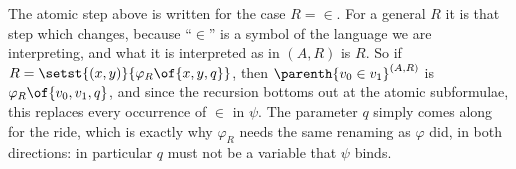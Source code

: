The atomic step above is written for the case $R = \in$. For a general $R$ it is that step which changes, because ``$\in$'' is a symbol of the language we are interpreting, and what it is interpreted as in $(A, R)$ is $R$. So if $R = \setst{(x, y)}{\varphi_R\of{x, y, q}}$, then $\parenth{v_0 \in v_1}^{(A, R)}$ is $\varphi_R\of{v_0, v_1, q}$, and since the recursion bottoms out at the atomic subformulae, this replaces every occurrence of $\in$ in $\psi$. The parameter $q$ simply comes along for the ride, which is exactly why $\varphi_R$ needs the same renaming as $\varphi$ did, in both directions: in particular $q$ must not be a variable that $\psi$ binds.
